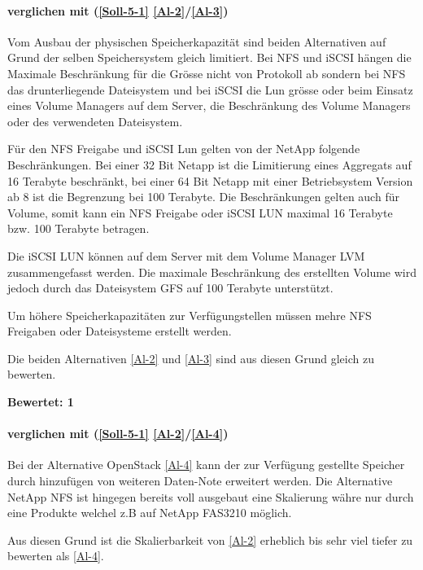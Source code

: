 \paragraph*{  verglichen mit  (\ref{Soll-5-1} \ref{Al-2}/\ref{Al-3})}
Vom Ausbau der physischen Speicherkapazität sind beiden Alternativen auf Grund der selben Speichersystem gleich limitiert. Bei NFS und iSCSI hängen die Maximale Beschränkung für die Grösse nicht von Protokoll ab sondern bei NFS das drunterliegende Dateisystem und bei iSCSI die Lun grösse oder beim Einsatz eines Volume Managers auf dem Server, die Beschränkung des Volume Managers oder des verwendeten Dateisystem. 

Für den NFS Freigabe und iSCSI Lun gelten von der NetApp folgende Beschränkungen.
Bei einer 32 Bit Netapp ist die Limitierung eines Aggregats auf 16 Terabyte beschränkt, bei einer 64 Bit Netapp mit einer Betriebsystem Version ab 8 ist die Begrenzung bei 100 Terabyte. Die Beschränkungen gelten auch für Volume, somit kann ein NFS Freigabe oder iSCSI LUN maximal 16 Terabyte bzw. 100 Terabyte betragen.

Die iSCSI LUN können auf dem Server mit dem Volume Manager LVM zusammengefasst werden. Die maximale Beschränkung des erstellten Volume wird jedoch durch das Dateisystem GFS auf 100 Terabyte unterstützt.

Um höhere Speicherkapazitäten zur Verfügungstellen müssen mehre NFS Freigaben oder Dateisysteme erstellt werden.

Die beiden Alternativen  \ref{Al-2} und  \ref{Al-3} sind aus diesen Grund gleich zu bewerten.

\textbf{Bewertet: 1}


\paragraph*{  verglichen mit  (\ref{Soll-5-1} \ref{Al-2}/\ref{Al-4})}
Bei der Alternative OpenStack \ref{Al-4} kann der zur Verfügung gestellte Speicher durch hinzufügen von weiteren Daten-Note erweitert werden. Die Alternative NetApp NFS ist hingegen bereits voll ausgebaut eine Skalierung währe nur durch eine Produkte welchel z.B auf NetApp FAS3210 möglich.

Aus diesen Grund ist die Skalierbarkeit von  \ref{Al-2} erheblich bis sehr viel tiefer zu bewerten als  \ref{Al-4}.

